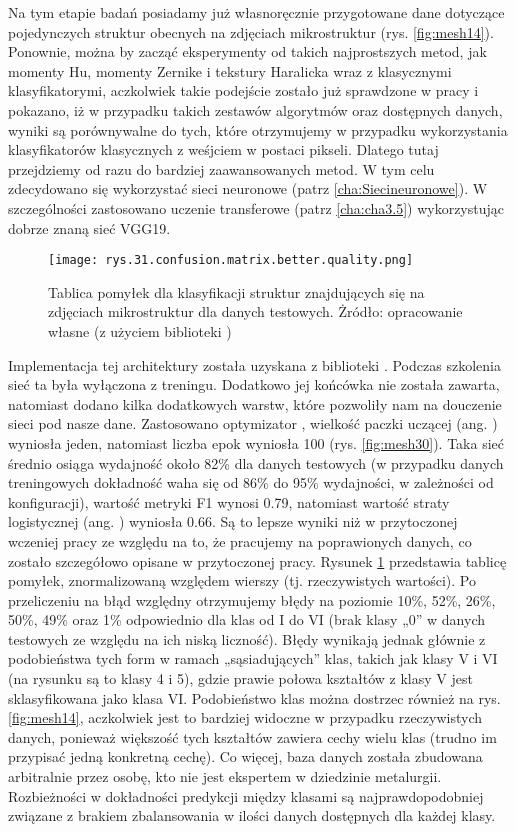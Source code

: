 Na tym etapie badań posiadamy już własnoręcznie przygotowane dane dotyczące pojedynczych struktur obecnych na zdjęciach mikrostruktur (rys. \ref{fig:mesh14}). Ponownie, można by zacząć eksperymenty od takich najprostszych metod, jak momenty Hu, momenty Zernike i tekstury Haralicka wraz z klasycznymi klasyfikatorymi, aczkolwiek takie podejście zostało już sprawdzone w pracy \cite{Reczek21} i pokazano, iż w przypadku takich zestawów algorytmów oraz dostępnych danych, wyniki są porównywalne do tych, które otrzymujemy w przypadku wykorzystania klasyfikatorów klasycznych z weśjciem w postaci pikseli. Dlatego tutaj przejdziemy od razu do bardziej zaawansowanych metod. W tym celu zdecydowano się wykorzystać sieci neuronowe (patrz \ref{cha:Siecineuronowe}). W szczególności zastosowano uczenie transferowe (patrz \ref{cha:cha3.5}) wykorzystując dobrze znaną sieć VGG19. 
\begin{figure}[h]
    \centering
    \texttt{[image: rys.31.confusion.matrix.better.quality.png]}  %
    \caption{Tablica pomyłek dla klasyfikacji struktur znajdujących się na zdjęciach mikrostruktur dla danych testowych. Żródło: opracowanie własne (z użyciem biblioteki )}
    \label{fig:mesh29}
\end{figure}
Implementacja tej architektury została uzyskana z biblioteki . Podczas szkolenia sieć ta była wyłączona z treningu. Dodatkowo jej końcówka nie została zawarta, natomiast dodano kilka dodatkowych warstw, które pozwoliły nam na douczenie sieci pod nasze dane. Zastosowano optymizator , wielkość paczki uczącej (ang. ) wyniosła jeden, natomiast liczba epok wyniosła 100 (rys. \ref{fig:mesh30}).  Taka sieć średnio osiąga wydajność około 82\% dla danych testowych (w przypadku danych treningowych dokładność waha się od 86\% do 95\% wydajności, w zależności od konfiguracji), wartość metryki F1 wynosi 0.79, natomiast wartość straty logistycznej (ang. ) wyniosła 0.66. Są to lepsze wyniki niż w przytoczonej wczeniej pracy \cite{Reczek21} ze względu na to, że pracujemy na poprawionych danych, co zostało szczegółowo opisane w przytoczonej pracy. Rysunek \ref{fig:mesh29} przedstawia tablicę pomyłek, znormalizowaną względem wierszy (tj. rzeczywistych wartości). 
Po przeliczeniu na błąd względny otrzymujemy błędy na poziomie 10\%, 52\%, 26\%, 50\%, 49\% oraz 1\% odpowiednio dla klas od I do VI (brak klasy „0” w danych testowych ze względu na ich niską liczność). Błędy wynikają jednak głównie z podobieństwa tych form w ramach „sąsiadujących” klas, takich jak klasy V i VI (na rysunku są to klasy 4 i 5), gdzie prawie połowa kształtów z klasy V jest sklasyfikowana jako klasa VI. Podobieństwo klas można dostrzec również na rys. \ref{fig:mesh14}, aczkolwiek jest to bardziej widoczne w przypadku rzeczywistych danych, ponieważ większość tych kształtów zawiera cechy wielu klas (trudno im przypisać jedną konkretną cechę). Co więcej, baza danych została zbudowana arbitralnie przez osobę, kto nie jest ekspertem w dziedzinie metalurgii. Rozbieżności w dokładności predykcji między klasami są najprawdopodobniej związane z brakiem zbalansowania w ilości danych dostępnych dla każdej klasy.
